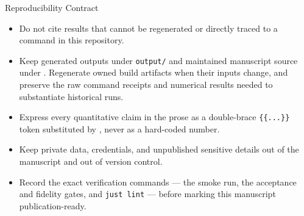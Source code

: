 \documentclass[
  ignorenonframetext,
]{beamer}
\providecommand{\tightlist}{%
  \setlength{\itemsep}{0pt}\setlength{\parskip}{0pt}}
\begin{document}
\begin{frame}{Reproducibility Contract}
\protect{}\label{reproducibility-contract}
\begin{itemize}
\tightlist
\item
  Do not cite results that cannot be regenerated or directly traced to a
  command in this repository.
\item
  Keep generated outputs under \texttt{output/} and maintained
  manuscript source under . Regenerate owned
  build artifacts when their inputs change, and preserve the raw command
  receipts and numerical results needed to substantiate historical runs.
\item
  Express every quantitative claim in the prose as a double-brace
  \texttt{\{\{...\}\}} token substituted by
  , never as a
  hard-coded number.
\item
  Keep private data, credentials, and unpublished sensitive details out
  of the manuscript and out of version control.
\item
  Record the exact verification commands --- the smoke run, the
  acceptance and fidelity gates, and \texttt{just\ lint} --- before
  marking this manuscript publication-ready.
\end{itemize}
\end{frame}
\end{document}
